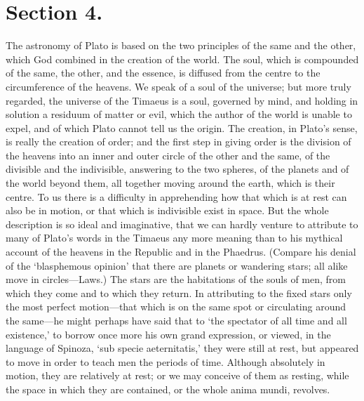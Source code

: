 \documentclass[11pt,letter]{article}
\begin{document}
\section{
      Section 4.
    }
\par  The astronomy of Plato is based on the two principles of the same and the other, which God combined in the creation of the world. The soul, which is compounded of the same, the other, and the essence, is diffused from the centre to the circumference of the heavens. We speak of a soul of the universe; but more truly regarded, the universe of the Timaeus is a soul, governed by mind, and holding in solution a residuum of matter or evil, which the author of the world is unable to expel, and of which Plato cannot tell us the origin. The creation, in Plato’s sense, is really the creation of order; and the first step in giving order is the division of the heavens into an inner and outer circle of the other and the same, of the divisible and the indivisible, answering to the two spheres, of the planets and of the world beyond them, all together moving around the earth, which is their centre. To us there is a difficulty in apprehending how that which is at rest can also be in motion, or that which is indivisible exist in space. But the whole description is so ideal and imaginative, that we can hardly venture to attribute to many of Plato’s words in the Timaeus any more meaning than to his mythical account of the heavens in the Republic and in the Phaedrus. (Compare his denial of the ‘blasphemous opinion’ that there are planets or wandering stars; all alike move in circles—Laws.) The stars are the habitations of the souls of men, from which they come and to which they return. In attributing to the fixed stars only the most perfect motion—that which is on the same spot or circulating around the same—he might perhaps have said that to ‘the spectator of all time and all existence,’ to borrow once more his own grand expression, or viewed, in the language of Spinoza, ‘sub specie aeternitatis,’ they were still at rest, but appeared to move in order to teach men the periods of time. Although absolutely in motion, they are relatively at rest; or we may conceive of them as resting, while the space in which they are contained, or the whole anima mundi, revolves.
\end{document}
